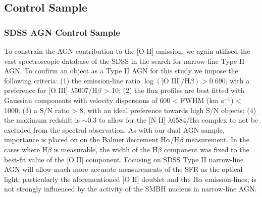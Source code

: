 \subsection{Control Sample}

\subsubsection{SDSS AGN Control Sample}

To constrain the AGN contribution to the $\text{[O II]}$ emission, we again utilised the vast spectroscopic database of the SDSS in the search for narrow-line Type II AGN. To confirm an object as a Type II AGN for this study we impose the following criteria: (1) the emission-line ratio $\log(\text{[O III]}/\text{H}\beta)>{0.690}$, with a preference for $\text{[O III]}$ $\lambda$5007/$\text{H}\beta$ > 10; (2) the flux profiles are best fitted with Gaussian components with velocity dispersions of 600 < FWHM (km s$^{-1}$) < 1000; (3) a S/N ratio > 8, with an ideal preference towards high S/N objects; (4) the maximum redshift is $\sim{0.3}$ to allow for the $\text{[N II]}$ $\lambda$6584/$\text{H}\alpha$ complex to not be excluded from the spectral observation. As with our dual AGN sample, importance is placed on on the Balmer decrement $\text{H}\alpha$/$\text{H}\beta$ measurement. In the cases where $\text{H}\beta$ is measurable, the width of the $\text{H}\beta$ component was fixed to the best-fit value of the $\text{[O II]}$ component. Focusing on SDSS Type II narrow-line AGN will allow much more accurate measurements of the SFR as the optical light, particularly the aforementioned $\text{[O II]}$ doublet and the $\text{H}\alpha$ emission-lines, is not strongly influenced by the activity of the SMBH nucleus in narrow-line AGN.
  
  
  
  